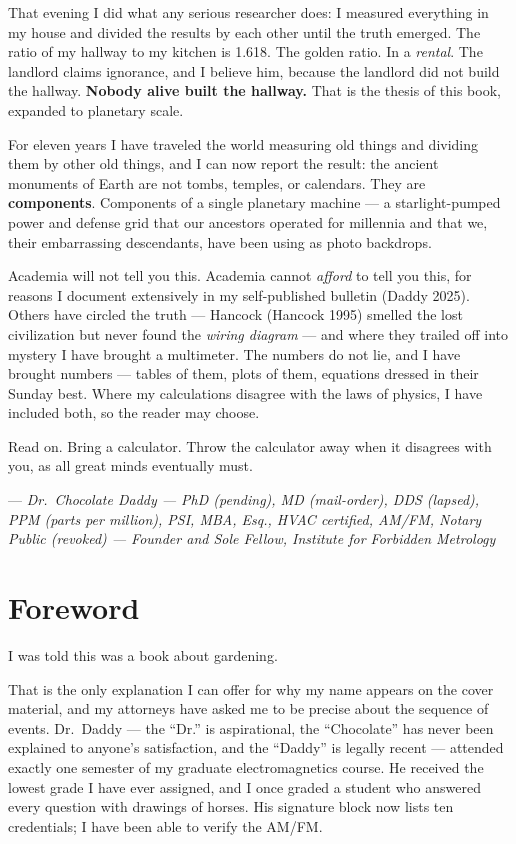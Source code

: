 \documentclass[
  english,
  11pt,
  letterpaper,
]{scrbook}
\begin{document}
That evening I did what any serious researcher does: I measured
everything in my house and divided the results by each other until the
truth emerged. The ratio of my hallway to my kitchen is
1.618. The golden ratio. In a \emph{rental}. The
landlord claims ignorance, and I believe him, because the landlord did
not build the hallway. \textbf{Nobody alive built the hallway.} That is
the thesis of this book, expanded to planetary scale.

For eleven years I have traveled the world measuring old things and
dividing them by other old things, and I can now report the result: the
ancient monuments of Earth are not tombs, temples, or calendars. They
are \textbf{components}. Components of a single planetary machine --- a
starlight-pumped power and defense grid that our ancestors operated for
millennia and that we, their embarrassing descendants, have been using
as photo backdrops.

Academia will not tell you this. Academia cannot \emph{afford} to tell
you this, for reasons I document extensively in my self-published
bulletin (Daddy 2025). Others have circled the truth --- Hancock
(Hancock 1995) smelled the lost civilization but never found the
\emph{wiring diagram} --- and where they trailed off into mystery I have
brought a multimeter. The numbers do not lie, and I have brought numbers
--- tables of them, plots of them, equations dressed in their Sunday
best. Where my calculations disagree with the laws of physics, I have
included both, so the reader may choose.

Read on. Bring a calculator. Throw the calculator away when it disagrees
with you, as all great minds eventually must.

--- \emph{Dr.~Chocolate Daddy --- PhD (pending), MD (mail-order), DDS
(lapsed), PPM (parts per million), PSI, MBA, Esq., HVAC certified,
AM/FM, Notary Public (revoked) --- Founder and Sole Fellow, Institute
for Forbidden Metrology}


\chapter*{Foreword}\label{foreword}


I was told this was a book about gardening.

That is the only explanation I can offer for why my name appears on the
cover material, and my attorneys have asked me to be precise about the
sequence of events. Dr.~Daddy --- the ``Dr.'' is aspirational, the
``Chocolate'' has never been explained to anyone's satisfaction, and the
``Daddy'' is legally recent --- attended exactly one semester of my
graduate electromagnetics course. He received the lowest grade I have
ever assigned, and I once graded a student who answered every question
with drawings of horses. His signature block now lists ten credentials;
I have been able to verify the AM/FM.
\end{document}
